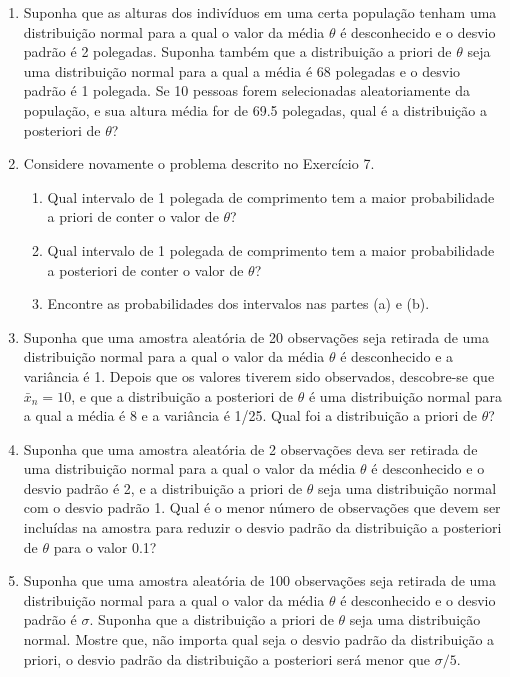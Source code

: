 \begin{enumerate}
    \item Suponha que as alturas dos indivíduos em uma certa população tenham uma distribuição normal para a qual o valor da média $\theta$ é desconhecido e o desvio padrão é 2 polegadas. Suponha também que a distribuição a priori de $\theta$ seja uma distribuição normal para a qual a média é 68 polegadas e o desvio padrão é 1 polegada. Se 10 pessoas forem selecionadas aleatoriamente da população, e sua altura média for de 69.5 polegadas, qual é a distribuição a posteriori de $\theta$?
    
    \item Considere novamente o problema descrito no Exercício 7.
    \begin{enumerate}[label=(\alph*)]
        \item Qual intervalo de 1 polegada de comprimento tem a maior probabilidade a priori de conter o valor de $\theta$?
        \item Qual intervalo de 1 polegada de comprimento tem a maior probabilidade a posteriori de conter o valor de $\theta$?
        \item Encontre as probabilidades dos intervalos nas partes (a) e (b).
    \end{enumerate}
    
    \item Suponha que uma amostra aleatória de 20 observações seja retirada de uma distribuição normal para a qual o valor da média $\theta$ é desconhecido e a variância é 1. Depois que os valores tiverem sido observados, descobre-se que $\bar{x}_n=10$, e que a distribuição a posteriori de $\theta$ é uma distribuição normal para a qual a média é 8 e a variância é 1/25. Qual foi a distribuição a priori de $\theta$?
    
    \item Suponha que uma amostra aleatória de 2 observações deva ser retirada de uma distribuição normal para a qual o valor da média $\theta$ é desconhecido e o desvio padrão é 2, e a distribuição a priori de $\theta$ seja uma distribuição normal com o desvio padrão 1. Qual é o menor número de observações que devem ser incluídas na amostra para reduzir o desvio padrão da distribuição a posteriori de $\theta$ para o valor 0.1?
    
    \item Suponha que uma amostra aleatória de 100 observações seja retirada de uma distribuição normal para a qual o valor da média $\theta$ é desconhecido e o desvio padrão é $\sigma$. Suponha que a distribuição a priori de $\theta$ seja uma distribuição normal. Mostre que, não importa qual seja o desvio padrão da distribuição a priori, o desvio padrão da distribuição a posteriori será menor que $\sigma/5$.
    

\end{enumerate}
